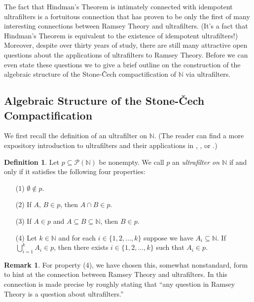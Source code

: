 \documentclass[12pt]{article}
\theoremstyle{plain}
\theoremstyle{definition}
\newtheorem{defn}[thm]{Definition}
\newtheorem{rmk}[thm]{Remark}
\newcommand{\bbN}{\mathbb{N}}
\begin{document}
The fact that Hindman's Theorem is intimately connected with
idempotent ultrafilters is a fortuitous connection that has proven to
be only the first of many interesting connections between Ramsey
Theory and ultrafilters.
(It's a fact that Hindman's Theorem is equivalent to the existence of
idempotent ultrafilters!)
Moreover, despite over thirty years of study, there are still many
attractive open questions about the applications of ultrafilters to
Ramsey Theory. 
Before we can even state these questions we to give a brief
outline on the construction of the algebraic structure of the
Stone-\v{C}ech compactification of $\bbN$ via ultrafilters.

\subsection{Algebraic Structure of the Stone-\v{C}ech Compactification}
We first recall the definition of an ultrafilter on $\bbN$.
(The reader can find a more expository introduction to ultrafilters
and their applications in \cite{Komjath:2008fk}, \cite{Gowers:zr}, or
\cite{Tao:2007uq}.)
  \begin{defn}
    \label{defn:uf}
    Let $p \subseteq \mathcal{P}(\bbN)$ be nonempty.
    We call $p$ an \textsl{ultrafilter on $\bbN$} if and only if it
    satisfies the following four properties:
      \begin{itemize}
        \item[(1)] $\emptyset \not\in p$.
        \item[(2)] If $A$, $B \in p$, then $A \cap B \in p$.
        \item[(3)] If $A \in p$ and $A \subseteq B \subseteq \bbN$,
          then $B \in p$.
        \item[(4)] Let $k \in \bbN$ and for each $i \in \{1, 2,
          \ldots, k\}$ suppose we have $A_i \subseteq \bbN$. 
          If $\bigcup_{i=1}^k A_i \in p$, then there exists $i \in
          \{1, 2, \ldots, k\}$ such that $A_i \in p$.
      \end{itemize}
  \end{defn}
  \begin{rmk}
    For property (4), we have chosen this, somewhat nonstandard, form
    to hint at the connection between Ramsey Theory and ultrafilters.
    In \cite[Theorem 5.7]{Hindman:1998fk} this connection is made
    precise by roughly stating that ``any question in Ramsey Theory is
    a question about ultrafilters.''
  \end{rmk}
\end{document}
